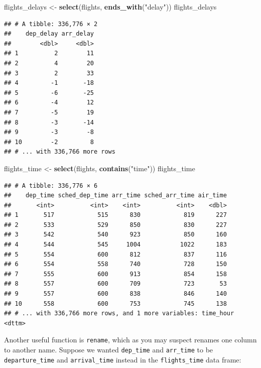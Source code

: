 \documentclass[]{tufte-book}
\newenvironment{Shaded}{\begin{snugshade}}{\end{snugshade}}
\newcommand{\KeywordTok}[1]{\textcolor[rgb]{0.13,0.29,0.53}{\textbf{{#1}}}}
\newcommand{\StringTok}[1]{\textcolor[rgb]{0.31,0.60,0.02}{{#1}}}
\newcommand{\NormalTok}[1]{{#1}}
\begin{document}
\begin{Shaded}
\begin{Highlighting}[]
\NormalTok{flights_delays <-}\StringTok{ }\KeywordTok{select}\NormalTok{(flights, }\KeywordTok{ends_with}\NormalTok{(}\StringTok{"delay"}\NormalTok{))}
\NormalTok{flights_delays}
\end{Highlighting}
\end{Shaded}

\begin{verbatim}
## # A tibble: 336,776 × 2
##    dep_delay arr_delay
##        <dbl>     <dbl>
## 1          2        11
## 2          4        20
## 3          2        33
## 4         -1       -18
## 5         -6       -25
## 6         -4        12
## 7         -5        19
## 8         -3       -14
## 9         -3        -8
## 10        -2         8
## # ... with 336,766 more rows
\end{verbatim}

\begin{Shaded}
\begin{Highlighting}[]
\NormalTok{flights_time <-}\StringTok{ }\KeywordTok{select}\NormalTok{(flights, }\KeywordTok{contains}\NormalTok{(}\StringTok{"time"}\NormalTok{))}
\NormalTok{flights_time}
\end{Highlighting}
\end{Shaded}

\begin{verbatim}
## # A tibble: 336,776 × 6
##    dep_time sched_dep_time arr_time sched_arr_time air_time
##       <int>          <int>    <int>          <int>    <dbl>
## 1       517            515      830            819      227
## 2       533            529      850            830      227
## 3       542            540      923            850      160
## 4       544            545     1004           1022      183
## 5       554            600      812            837      116
## 6       554            558      740            728      150
## 7       555            600      913            854      158
## 8       557            600      709            723       53
## 9       557            600      838            846      140
## 10      558            600      753            745      138
## # ... with 336,766 more rows, and 1 more variables: time_hour <dttm>
\end{verbatim}

Another useful function is \texttt{rename}, which as you may suspect
renames one column to another name. Suppose we wanted \texttt{dep\_time}
and \texttt{arr\_time} to be \texttt{departure\_time} and
\texttt{arrival\_time} instead in the \texttt{flights\_time} data frame:
\end{document}
